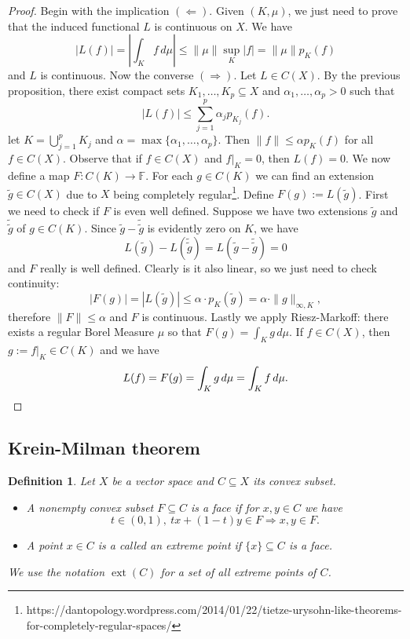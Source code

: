 \documentclass[10pt, a4paper]{article}
\newtheorem{defi}[thm]{Definition}
\newenvironment{noticeB}{%
  \tcolorbox[%
  notitle,
  empty,
  enhanced,  %
  breakable,
  coltext=black,
  colback=white, 
  fontupper=\rmfamily,
  noparskip,
  sharp corners,
  boxrule=-1pt,  %
  frame hidden,
  left=7pt,  %
  right=7pt,
  top=5pt,
  bottom=5pt,
  before skip=2.5ex plus 2pt,
  after skip=2.5ex plus 2pt,
  borderline west = {1.5pt}{-0.1pt}{blue!30!black}, %
  overlay unbroken and last={%
    \draw[color=black, line width=1.25pt]
    ($(frame.south west)+(1.pt, -0.1pt)$) -- ++(2em, 0);
  }
  ]}
{\endtcolorbox}
\newenvironment{definition}{\begin{noticeB}\begin{defi}}{%
    \end{defi}\end{noticeB}}
\newenvironment{noticeC}{%
  \tcolorbox[%
  notitle,
  empty,
  enhanced,  %
  breakable,
  coltext=black, 
  fontupper=\rmfamily,
  noparskip,
  sharp corners,
  boxrule=-1pt,  %
  frame hidden,
  left=7pt,  %
  right=7pt,
  top=5pt,
  bottom=5pt,
  before skip=2.5ex plus 2pt,
  after skip=2.5ex plus 2pt,
  overlay unbroken and last={%
  },
  ]}
{\endtcolorbox}
\newenvironment{myproof}%
  {\begin{noticeC}\begin{proof}}%
  {\end{proof}\end{noticeC}}
\newcommand{\F}{\mathbb {F}}
\DeclareMathOperator{\ext}{ext}
\begin{document}
\begin{myproof}
  Begin with the implication $(\Leftarrow)$. Given $(K, \mu)$, we just need to prove that the induced 
  functional $L$ is continuous on $X$. We have 
  $$|L(f)| = \left| \int_K f\, d\mu \right| \leq \|\mu\| \sup_K |f| = \|\mu\| p_K (f)$$
  and $L$ is continuous. Now the converse $(\Rightarrow)$.
  Let $L \in C(X)$. By the previous proposition, there exist compact sets 
  $K_1, \dots, K_p \subseteq X$ and $\alpha_1, \dots, \alpha_p > 0$ such that 
  $$|L(f)| \leq \sum_{j = 1} ^p \alpha_j p_{K_j} (f).$$
  let $K = \bigcup_{j = 1} ^p K_j$ and $\alpha = \max \{\alpha_1, \dots, \alpha_p\}$.
  Then $\|f\| \leq \alpha p_K (f)$ for all $f \in C(X)$.
  Observe that if $f \in C(X)$ and $f \big|_K = 0$, then $L(f) = 0$.
  We now define a map $F: C(K) \to \F$. For each $g \in C(K)$
  we can find an extension $\widetilde{g} \in C(X)$ due to $X$ being completely regular\footnote{https://dantopology.wordpress.com/2014/01/22/tietze-urysohn-like-theorems-for-completely-regular-spaces/}. 
  Define $F(g) := L(\widetilde{g})$.
  First we need to check if $F$ is even well defined. Suppose we have two extensions $\widetilde{g}$ and $\widetilde{\widetilde{g}}$
  of $g \in C(K)$. Since $\widetilde{g} - \widetilde{\widetilde{g}}$ is evidently zero on $K$, we have 
  $$L(\widetilde{g}) - L(\widetilde{\widetilde{g}}) = L(\widetilde{g} - \widetilde{\widetilde{g}}) = 0$$
  and $F$ really is well defined. Clearly is it also linear, so we just need to check continuity:
  $$|F(g)| = |L(\widetilde{g})| \leq \alpha \cdot p_K (\widetilde{g}) = \alpha \cdot \|g\|_{\infty, K},$$
  therefore $\|F\| \leq \alpha$ and $F$ is continuous. Lastly we apply Riesz-Markoff: there exists a regular Borel Measure $\mu$
  so that $F(g) = \int_K g\, d\mu.$ If $f \in C(X)$, then $g := f\big|_K \in C(K)$
  and we have 
  \begin{equation*}
    L(f) = F(g) = \int_K g\, d\mu = \int_K f \, d\mu. \qedhere
  \end{equation*}
\end{myproof}

\subsection{Krein-Milman theorem}

\begin{definition}
  Let $X$ be a vector space and $C \subseteq X$ its convex subset.
  \begin{itemize}
    \item[(a)] A nonempty convex subset $F \subseteq C$ is a face if for $x, y \in C$ we have
    $$t \in (0, 1),\ tx + (1 - t)y \in F \Rightarrow x, y \in F.$$
    \item[(b)] A point $x \in C$ is a called an extreme point if $\{x\} \subseteq C$ is a face.  
  \end{itemize}
  We use the notation $\ext (C)$ for a set of all extreme points of $C$.
\end{definition}
\end{document}
